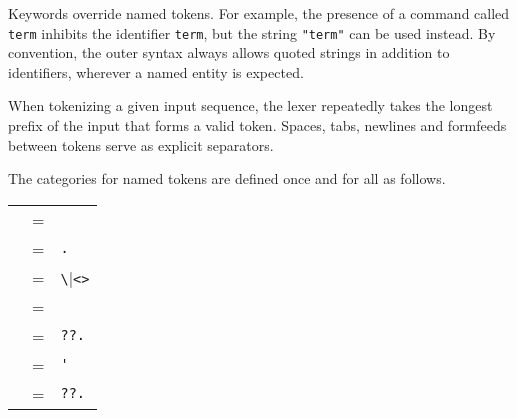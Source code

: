 \begin{isabellebody}
\begin{isamarkuptext}
  Keywords override named tokens.  For example, the presence of a
  command called \verb|term| inhibits the identifier \verb|term|, but the string \verb|"term"| can be used instead.
  By convention, the outer syntax always allows quoted strings in
  addition to identifiers, wherever a named entity is expected.

  When tokenizing a given input sequence, the lexer repeatedly takes
  the longest prefix of the input that forms a valid token.  Spaces,
  tabs, newlines and formfeeds between tokens serve as explicit
  separators.

  \medskip The categories for named tokens are defined once and for
  all as follows.

  \begin{center}
  \begin{supertabular}{rcl}
    \hypertarget{syntax.ident}{\hyperlink{syntax.ident}{\mbox{}}} & = &  \\
    \hypertarget{syntax.longident}{\hyperlink{syntax.longident}{\mbox{}}} & = & \verb|.| \\
    \hypertarget{syntax.symident}{\hyperlink{syntax.symident}{\mbox{}}} & = & \verb|\|\verb|<|\verb|>| \\
    \hypertarget{syntax.nat}{\hyperlink{syntax.nat}{\mbox{}}} & = &  \\
    \hypertarget{syntax.var}{\hyperlink{syntax.var}{\mbox{}}} & = & \verb|?|\verb|?|\verb|.| \\
    \hypertarget{syntax.typefree}{\hyperlink{syntax.typefree}{\mbox{}}} & = & \verb|'| \\
    \hypertarget{syntax.typevar}{\hyperlink{syntax.typevar}{\mbox{}}} & = & \verb|?|\verb|?|\verb|.| \\

\end{supertabular}
\end{center}
\end{isamarkuptext}
\end{isabellebody}
